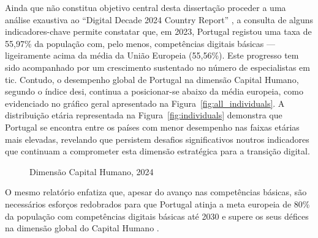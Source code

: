 Ainda que não constitua objetivo central desta dissertação proceder a uma análise exaustiva ao ``Digital Decade 2024 Country Report'' \cite{DESI2024}, a consulta de alguns indicadores-chave permite constatar que, em 2023, Portugal registou uma taxa de 55,97\% da população com, pelo menos, competências digitais básicas — ligeiramente acima da média da União Europeia (55,56\%). Este progresso tem sido acompanhado por um crescimento sustentado no número de especialistas em \acrshort{tic}.
Contudo, o desempenho global de Portugal na dimensão Capital Humano, segundo o índice \acrshort{desi}, continua a posicionar-se abaixo da média europeia, como evidenciado no gráfico geral apresentado na Figura~\ref{fig:all_individuals}. A distribuição etária representada na Figura~\ref{fig:individuals} demonstra que Portugal se encontra entre os países com menor desempenho nas faixas etárias mais elevadas, revelando que persistem desafios significativos noutros indicadores que continuam a comprometer esta dimensão estratégica para a transição digital.

\begin{figure}[hbtp]
	\centering%
		\centering
		\qquad
		\caption{Dimensão Capital Humano, 2024 \cite{itu2024facts}}%
		\label{fig:capitalhumano}%
	\end{figure}

O mesmo relatório enfatiza que, apesar do avanço nas competências básicas, são necessários esforços redobrados para que Portugal atinja a meta europeia de 80\% da população com competências digitais básicas até 2030 e supere os seus défices na dimensão global do Capital Humano \cite{DESI2024}.

